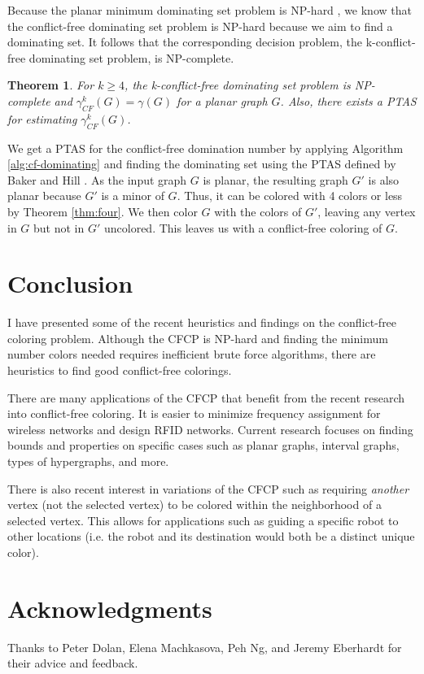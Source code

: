 \documentclass{sig-alternate}
\newtheorem{theorem}{Theorem}
\begin{document}
Because the planar minimum dominating set problem is NP-hard \cite{garey2002computers}, we know that the conflict-free dominating set problem is NP-hard because we aim to find a dominating set. It follows that the corresponding decision problem, the k-conflict-free dominating set problem, is NP-complete.

\begin{theorem} \label{thm:approximate-cfds}
For $k \geq 4$, the k-conflict-free dominating set problem is NP-complete and $\gamma_{CF}^k(G) = \gamma(G)$ for a planar graph $G$. Also, there exists a PTAS for estimating $\gamma_{CF}^k(G)$.
\end{theorem}

We get a PTAS for the conflict-free domination number by applying Algorithm \ref{alg:cf-dominating} and finding the dominating set using the PTAS defined by Baker and Hill \cite{baker1994approximation}. As the input graph $G$ is planar, the resulting graph $G'$ is also planar because $G'$ is a minor of $G$. Thus, it can be colored with 4 colors or less by Theorem \ref{thm:four}. We then color $G$ with the colors of $G'$, leaving any vertex in $G$ but not in $G'$ uncolored. This leaves us with a conflict-free coloring of $G$.



\section{Conclusion}
\label{sec:conclusion}
I have presented some of the recent heuristics and findings on the conflict-free coloring problem. Although the CFCP is NP-hard and finding the minimum number colors needed requires inefficient brute force algorithms, there are heuristics to find good conflict-free colorings.

There are many applications of the CFCP that benefit from the recent research into conflict-free coloring. It is easier to minimize frequency assignment for wireless networks and design RFID networks. Current research focuses on finding bounds and properties on specific cases such as planar graphs, interval graphs, types of hypergraphs, and more.

There is also recent interest in variations of the CFCP such as requiring \emph{another} vertex (not the selected vertex) to be colored within the neighborhood of a selected vertex. This allows for applications such as guiding a specific robot to other locations (i.e. the robot and its destination would both be a distinct unique color).

\section{Acknowledgments}
Thanks to Peter Dolan, Elena Machkasova, Peh Ng, and Jeremy Eberhardt for their advice and feedback.



\end{document}
